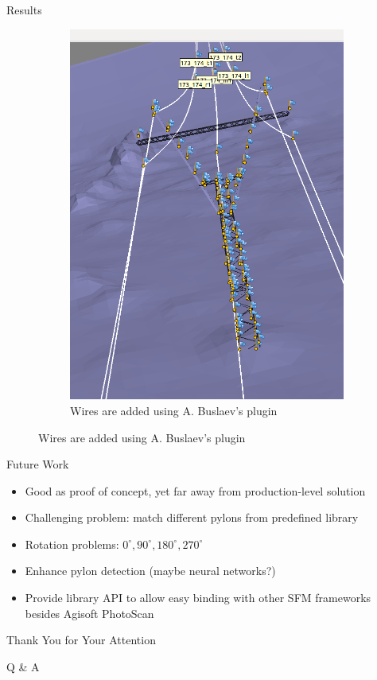 \documentclass{beamer}
\begin{document}
\begin{frame}[t, fragile]{Results}
\begin{figure}
\begin{subfigure}{.5\textwidth}
\includegraphics[scale=0.15]{results_cool_wires}
\caption{Wires are added using A. Buslaev's plugin}
\end{subfigure}
\end{figure}
\end{frame}


\begin{frame}[t, fragile]{Future Work}
\begin{itemize}
\item Good as proof of concept, yet far away from production-level solution
\item Challenging problem: match different pylons from predefined library
\item Rotation problems: $0^\circ, 90^\circ, 180^\circ, 270^\circ$
\item Enhance pylon detection (maybe neural networks?)
\item Provide library API to allow easy binding with other SFM frameworks besides Agisoft PhotoScan
\end{itemize}
\end{frame}

\begin{frame}[fragile]{Thank You for Your Attention}

\begin{center}
\Huge Q \& A
\end{center}
\end{frame}
\end{document}
